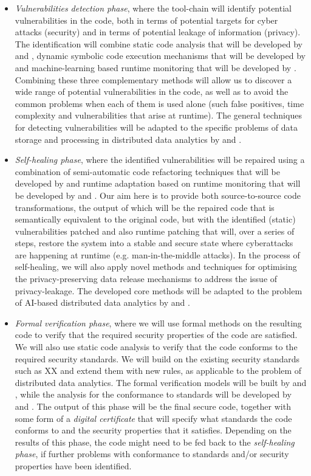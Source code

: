 \documentclass[a4paper,11pt]{article}
\begin{document}
\begin{itemize}
\item \emph{Vulnerabilities detection phase}, where the tool-chain will identify potential vulnerabilities in the code, both in terms of potential targets for cyber attacks (security) and in terms of potential leakage of information (privacy). The identification will combine static code analysis that will be developed by \YAGshort{} and \UCMshort{}, dynamic symbolic code execution mechanisms that will be developed by \IBMshort{} and machine-learning based runtime monitoring that will be developed by \SCCHshort{}. Combining these three complementary methods will allow us to discover a wide range of potential vulnerabilities in the code, as well as to avoid the common problems when each of them is used alone (such false positives, time complexity and vulnerabilities that arise at runtime). The general techniques for detecting vulnerabilities will be adapted to the specific problems of data storage and processing in distributed data analytics by \UODshort{} and \SCCHshort{}. 

\item \emph{Self-healing phase}, where the identified vulnerabilities will be repaired using a combination of semi-automatic code refactoring techniques that will be developed by \SAshort{} and runtime adaptation based on runtime monitoring that will be developed by \DEMshort{} and \SCCHshort{}. Our aim here is to provide both source-to-source code transformations, the output of which will be the repaired code that is semantically equivalent to the original code, but with the identified (static) vulnerabilities patched and also runtime patching that will, over a series of steps, restore the system into a stable and secure state where cyberattacks are happening at runtime (e.g. man-in-the-middle attacks). In the process of self-healing, we will also apply novel methods and techniques for optimising the privacy-preserving data release mechanisms to address the issue of privacy-leakage. The developed core methods will be adapted to the problem of AI-based distributed data analytics by \DEMshort{} and \UODshort{}. 

\item \emph{Formal verification phase}, where we will use formal methods on the resulting code to verify that the required security properties of the code are satisfied. We will also use static code analysis to verify that the code conforms to the required security standards. We will build on the existing security standards such as XX and extend them with new rules, as applicable to the problem of distributed data analytics. The formal verification models will be built by \SCCHshort{} and \SAshort{}, while the analysis for the conformance to standards will be developed by \UCMshort{} and \YAGshort{}. The output of this phase will be the final secure code, together with some form of a \emph{digital certificate} that will specify what standards the code conforms to and the security properties that it satisfies. Depending on the results of this phase, the code might need to be fed back to the \emph{self-healing phase}, if further problems with conformance to standards and/or security properties have been identified.
\end{itemize}
\end{document}
